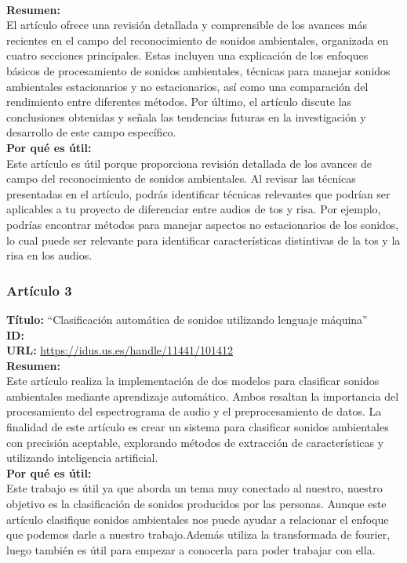     \\
    \textbf{Resumen:\\}
    El artículo ofrece una revisión detallada y comprensible de los avances más recientes en el campo del reconocimiento de sonidos ambientales, organizada en cuatro secciones principales. Estas incluyen una explicación de los enfoques básicos de procesamiento de sonidos ambientales, técnicas para manejar sonidos ambientales estacionarios y no estacionarios, así como una comparación del rendimiento entre diferentes métodos. Por último, el artículo discute las conclusiones obtenidas y señala las tendencias futuras en la investigación y desarrollo de este campo específico.
    \\
    \textbf{Por qué es útil:\\}
    Este artículo es útil porque proporciona revisión detallada de los avances de campo del reconocimiento de sonidos ambientales. Al revisar las técnicas presentadas en el artículo, podrás identificar técnicas relevantes que podrían ser aplicables a tu proyecto de diferenciar entre audios de tos y risa. Por ejemplo, podrías encontrar métodos para manejar aspectos no estacionarios de los sonidos, lo cual puede ser relevante para identificar características distintivas de la tos y la risa en los audios.
\subsubsection*{Artículo 3}
    \textbf{Título:}
    “Clasificación automática de sonidos utilizando lenguaje máquina”
    \\
    \textbf{ID: \cite{rodriguez2020clasificacion}}
    \\
    \textbf{URL:}
    \url{https://idus.us.es/handle/11441/101412}
    \\
    \textbf{Resumen:\\}
    Este artículo realiza la implementación de dos modelos para clasificar sonidos ambientales mediante aprendizaje automático. Ambos resaltan la importancia del procesamiento del espectrograma de audio y el preprocesamiento de datos. La finalidad de este artículo es crear un sistema para clasificar sonidos ambientales con precisión aceptable, explorando métodos de extracción de características y utilizando inteligencia artificial.
    \\
    \textbf{Por qué es útil:\\}
    Este trabajo es útil ya que aborda un tema muy conectado al nuestro, nuestro objetivo es la clasificación de sonidos producidos por las personas. Aunque este artículo clasifique sonidos ambientales nos puede ayudar a relacionar el enfoque que podemos darle a nuestro trabajo.Además utiliza la transformada de fourier, luego también es útil para empezar a conocerla para poder trabajar con ella.
